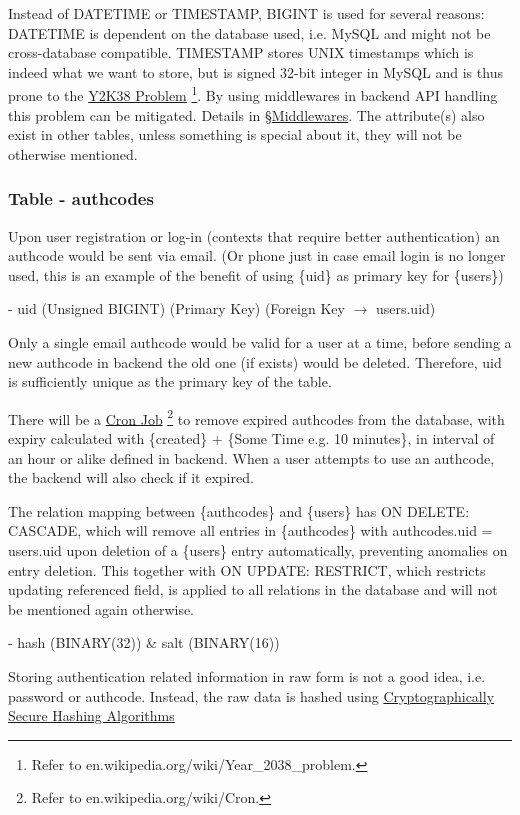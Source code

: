 \documentclass[12pt]{report}
\newcommand{\n}{\par}
\newcommand{\br}{\n\vspace{1 em}\n}
\begin{document}
Instead of DATETIME or TIMESTAMP, BIGINT is used for several reasons:
DATETIME is dependent on the database used, i.e. MySQL and might not be cross-database compatible.
TIMESTAMP stores UNIX timestamps which is indeed what we want to store,
but is signed 32-bit integer in MySQL and is thus prone to the
\href{https://en.wikipedia.org/wiki/Year_2038_problem}{Y2K38 Problem}
\footnote{Refer to en.wikipedia.org\-/wiki/Year\_2038\_problem.}.
By using middlewares in backend API handling this problem can be mitigated.
Details in \S \hyperref[application-layer.design.middlewares]{Middlewares}.
The attribute(s) also exist in other tables, unless something is special about it, they will not be otherwise mentioned.

\subsubsection{Table - authcodes} \label{data-layer.design.user-system.authcodes}
Upon user registration or log-in (contexts that require better authentication) an authcode would be sent via email.
(Or phone just in case email login is no longer used, this is an example of the benefit of using \{uid\} as primary key for \{users\})
\br
- uid (Unsigned BIGINT) (Primary Key) (Foreign Key $\rightarrow$ users.uid)\n
Only a single email authcode would be valid for a user at a time,
before sending a new authcode in backend the old one (if exists) would be deleted.
Therefore, uid is sufficiently unique as the primary key of the table.\n
There will be a \href{https://en.wikipedia.org/wiki/Cron}{Cron Job}
\footnote{Refer to en.wikipedia.org/wiki/Cron.}
to remove expired authcodes from the database,
with expiry calculated with \{created\} + \{Some Time e.g. 10 minutes\},
in interval of an hour or alike defined in backend.
When a user attempts to use an authcode, the backend will also check if it expired.\n
The relation mapping between \{authcodes\} and \{users\} has ON DELETE: CASCADE,
which will remove all entries in \{authcodes\} with authcodes.uid = users.uid upon deletion of a \{users\} entry automatically,
preventing anomalies on entry deletion.
This together with ON UPDATE: RESTRICT, which restricts updating referenced field,
is applied to all relations in the database and will not be mentioned again otherwise.
\br
- hash (BINARY(32)) \& salt (BINARY(16))\n
Storing authentication related information in raw form is not a good idea, i.e. password or authcode.
Instead, the raw data is hashed using
\href{https://en.wikipedia.org/wiki/Cryptographic_hash_function}{Cryptographically Secure Hashing Algorithms}
\end{document}
